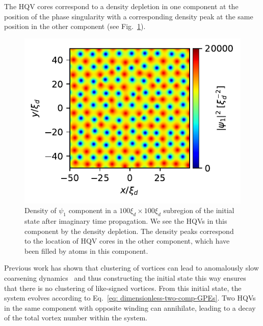 The HQV cores correspond to a density depletion in one component at the position
of the phase singularity with a corresponding density peak at the same position
in the other component (see Fig.~\ref{fig:initial-vortex-state}).
\begin{figure}
    \centering
    \includegraphics{gfx/ch-twoCompDynamics/init_state.pdf}
    \caption[Initial state of a two-component system filled with half-quantum
    vortices]
    {Density of \(\psi_1 \) component in a \(100\xi_d\times100\xi_d\)
        subregion of the initial state after imaginary time propagation.
        We see the HQVs in this component by the density depletion.
        The density peaks correspond to the location of HQV cores in the other
        component, which have been filled by atoms in this
        component.\label{fig:initial-vortex-state}}
\end{figure}
Previous work has shown that clustering of vortices can lead to anomalously
slow coarsening dynamics~\cite{Karl2017} and thus constructing the initial
state this way ensures that there is no clustering of like-signed vortices.
From this initial state, the system evolves according to
Eq.~\eqref{eq: dimensionless-two-comp-GPEs}.
Two HQVs in the same component with opposite winding can annihilate, leading to
a decay of the total vortex number within the system.

